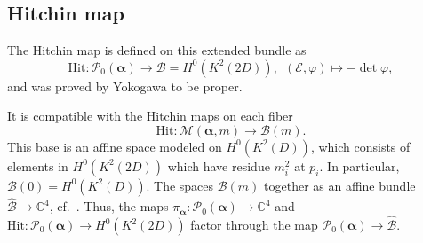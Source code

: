 \documentclass[12pt,letterpaper,reqno]{amsart}
\def\mathbf#1{#1}%
\theoremstyle{remark}
\theoremstyle{definition}
\numberwithin{thm}{section}
\numberwithin{equation}{section}
\numberwithin{figure}{section}
\newcommand{\C}{\ensuremath{\mathbb C}}
\newcommand{\calB}{\mathcal B}
\newcommand{\calP}{\mathcal P}
\newcommand{\calM}{\mathcal M}
\newcommand{\bsa}{\boldsymbol{\alpha}}
\newcommand{\bfm}{\mathbf{m}}
\begin{document}
\subsection{Hitchin map}
The Hitchin map is defined on this extended bundle as
\[
\mathrm{Hit}: \mathcal{P}_0(\boldsymbol{\alpha}) \to \mathcal{B}=H^0(K^2(2D)), \ \ (\mathcal{E}, \varphi) \mapsto -\det \varphi,
\]
and was proved by Yokogawa \cite{yokogawa93} to be proper. 

It is compatible with the Hitchin maps on each fiber
\[ 
\mathrm{Hit}: \calM(\bsa, \bfm) \to \calB(\bfm).
\] 
This base is an affine space modeled on $H^0(K^2(D))$, which consists of elements in $H^0(K^2(2D))$ which have residue $m_i^2$ at $p_i$.
In particular, $\calB(\mathbf{0})=H^0(K^2(D))$.  The spaces $\calB(\bfm)$ together as an affine bundle $\widehat{\calB} \to \C^4$, cf.\ 
\cite[Remark 5.6]{collier2024conformallimitsparabolicslnchiggs}.  Thus, the maps $\pi_{\bsa}: \calP_0(\bsa) \to \C^4$ and 
$\mathrm{Hit}:\calP_0(\bsa) \to H^0(K^2(2D))$ factor through the map $\calP_0(\bsa) \to \widehat{\calB}$.
\end{document}
